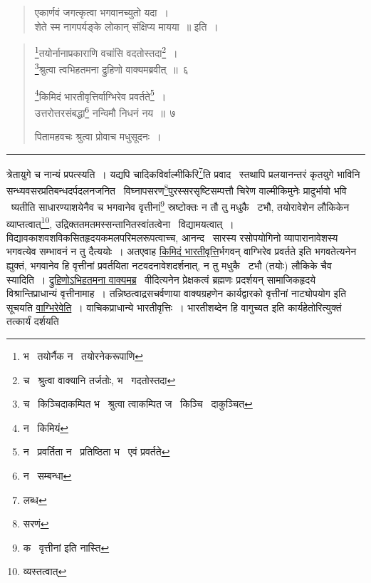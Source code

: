 \documentclass[11pt, openany]{book}
\begin{document}
\begin{quote}
{\qt एकार्णवं जगत्कृत्वा भगवानच्युतो यदा~।\\
शेते स्म नागपर्यङ्के लोकान् संक्षिप्य मायया~॥} इति~।
\end{quote}

\newpage
{}

\begin{quote}
{\na \renewcommand{\thefootnote}{1}\footnote{भ \textendash\ तयोर्नैक न \textendash\ तयोरनेकरूपाणि}तयोर्नानाप्रकाराणि वचांसि वदतोस्तदा\renewcommand{\thefootnote}{2}\footnote{च \textendash\ श्रुत्वा वाक्यानि तर्जतोः, भ \textendash\ गदतोस्तदा}~।\\
\renewcommand{\thefootnote}{3}\footnote{च \textendash\ किञ्चिदाकम्पित भ \textendash\ श्रुत्वा त्वाकम्पित ज \textendash\ किञ्चि \textendash\ दाकुञ्चित}श्रुत्वा त्वभिहतमना द्रुहिणो वाक्यमब्रवीत्~॥~६

\renewcommand{\thefootnote}{4}\footnote{न \textendash\ किमियं}किमिदं भारतीवृत्तिर्वाग्भिरेव प्रवर्तते\renewcommand{\thefootnote}{5}\footnote{न \textendash\ प्रवर्तिता न \textendash\ प्रतिष्ठिता भ \textendash\ एवं प्रवर्तते}~।\\
उत्तरोत्तरसंबद्धा\renewcommand{\thefootnote}{6}\footnote{न \textendash\ सम्बन्धा} नन्विमौ निधनं नय~॥~७

पितामहवचः श्रुत्वा प्रोवाच मधुसूदनः~।}
\end{quote}

\hrule

\vspace{2mm}
त्रेतायुगे च नान्यं प्रपत्स्यति~। यद्यपि चादिकविर्वाल्मीकिरि\renewcommand{\thefootnote}{1}\footnote{लब्ध}ति प्रवाद \textendash\ स्तथापि प्रलयानन्तरं कृतयुगे भाविनि सन्ध्यवसरप्रतिबन्धदर्पदलनजनित \textendash\ विघ्नापसरण\renewcommand{\thefootnote}{2}\footnote{सरणं}पुरस्सरसृष्टिसम्पत्तौ चिरेण वाल्मीकिमुनेः प्रादुर्भावो भवि \textendash\ ष्यतीति साधारण्याशयेनैव च भगवानेव वृत्तीनां\renewcommand{\thefootnote}{3}\footnote{क \textendash\ {\qt वृत्तीनां} इति नास्ति} स्रष्टोक्तः न तौ तु मधुकै \textendash\ टभौ, तयोरावेशेन लौकिकेन व्याप्तत्वात्\renewcommand{\thefootnote}{4}\footnote{व्यस्तत्वात्}, उद्रिक्ततमतमस्सन्तानितस्वांतत्वेना \textendash\ विद्यामयत्वात्~। विद्यावकाशवशविकसितहृदयकमलपरिमलरूपत्वाच्च, आनन्द \textendash\ सारस्य रसोपयोगिनो व्यापारानावेशस्य भगवत्येव सम्भावनं न तु दैत्ययोः~। अतएवाह \underline{किमिदं भारतीवृत्ति}र्भगवन् वाग्भिरेव प्रवर्तते इति भगवतेत्यनेन ह्युक्तं, भगवानेव हि वृत्तीनां प्रवर्तयिता नटवदनावेशदर्शनात्, न तु मधुकै \textendash\ टभौ (तयोः) लौकिके चैव स्यादिति~। \underline{द्रुहिणोऽभिहतमना वाक्यमब्र} \textendash\ वीदित्यनेन प्रेक्षकत्वं ब्रह्मणः प्रदर्शयन् सामाजिकहृदये विश्रान्तिप्राधान्यं वृत्तीनामाह~। तन्निष्ठत्वाद्रसचर्वणाया वाक्यग्रहणेन कार्यद्वारको वृत्तीनां नाट्योपयोग इति सूचयति \underline{वाग्भिरेवेति}~। वाचिकप्राधान्ये भारतीवृत्तिः~। भारतीशब्देन हि वागुच्यत इति कार्यहेतोरित्युक्तं तत्कार्यं दर्शयति
\end{document}
